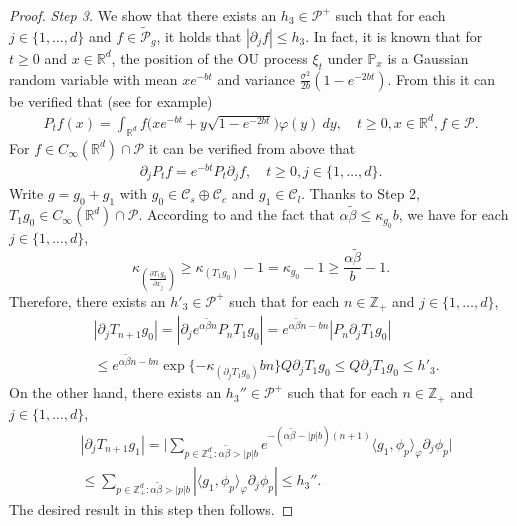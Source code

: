 \documentclass[12pt,a4paper]{amsart}
\theoremstyle{plain}
\theoremstyle{definition}
\numberwithin{equation}{section}
\begin{document}
\begin{proof}
\emph{Step 3.} We show that there exists an $h_3 \in \mathcal P^+$ such that for each $j \in \{1,\dots, d\}$ and $f \in \widetilde {\mathcal P}_g$, it holds that $|\partial_j f| \leq h_3$. 
In fact, it is known that for $t\geq 0$ and $x\in \mathbb R^d$, the position of the OU process $\xi_t$ under $\mathbb P_x$ is a Gaussian random variable with mean $xe^{-bt}$ and variance $\frac{\sigma^2}{2b} (1- e^{-2bt})$. From this it can be verified that (see \cite{MetafunePallaraPriola2002Spectrum} for example) 
\begin{align}
  \label{eq:P:R:3:-1}
  P_t f(x) = \int_{\mathbb R^d} f\big(x e^{-bt} + y \sqrt{1-e^{-2bt}}\big) \varphi(y)~dy,
  \quad t\geq 0, x\in \mathbb R^d, f\in \mathcal P.
\end{align}
For $f \in C_\infty(\mathbb R^d)\cap \mathcal P$ it can be verified from above that
\begin{align}
  \label{eq:P:R:3:1}
 \partial_j P_t f = e^{-bt} P_t \partial_j f,
 \quad t \geq 0, j \in \{1,\dots, d\}. 
\end{align}
Write $g = g_0 + g_1$ with $g_0 \in \mathcal C_s \oplus \mathcal C_c$ and $g_1 \in \mathcal C_l$. Thanks to Step 2, $T_1 g_0 \in C_\infty(\mathbb R^d)\cap \mathcal P$. 
According to \cite[Fact 1.3]{MarksMilos2018CLT} and the fact that $\alpha \tilde \beta \leq \kappa _{g_0} b$, we have for each $j \in \{1,\dots, d\}$, 
\[
  \kappa_{(\frac{\partial T_1 g_0}{\partial x_j})} 
  \geq \kappa_{(T_1 g_0)} - 1
  = \kappa_{g_0} - 1 
  \geq \frac{\alpha \tilde \beta}{b} - 1.
\]
Therefore, there exists an $h'_3\in \mathcal P^+$ such that for each $n \in \mathbb Z_+$ and $j\in \{1,\dots,d\}$, 
\begin{align}
  & | \partial_j T_{n+1}g_0 | 
  = | \partial_j e^{\alpha \tilde \beta n}P_n T_1g_0 | 
  = e^{\alpha \tilde \beta n-bn} |P_n \partial_j T_1 g_0| \\
  & \leq e^{\alpha \tilde \beta n-bn} \exp\{-\kappa_{(\partial_j T_1 g_0)}bn\}Q \partial_j T_1g_0
  \leq Q\partial_j T_1g_0
    \leq h'_3.
\end{align}
On the other hand, there exists an $h_3''\in \mathcal P^+$ such that for each $n \in \mathbb Z_+$ and $j\in \{1,\dots,d\}$, 
\begin{align}
  & |\partial_j T_{n+1}g_1 |
  = \Big| \sum_{p\in \mathbb Z_+^d: \alpha \tilde \beta > |p|b} e^{- (\alpha \tilde \beta - |p|b)(n+1)} \langle g_1, \phi_p \rangle_\varphi \partial_j \phi_p \Big| \\
  & \leq \sum_{p\in \mathbb Z_+^d: \alpha \tilde \beta > |p|b} |\langle g_1, \phi_p \rangle_\varphi \partial_j \phi_p | 
    \leq h_3''.
\end{align}
The desired result in this step then follows.
  


\end{proof}
\end{document}
